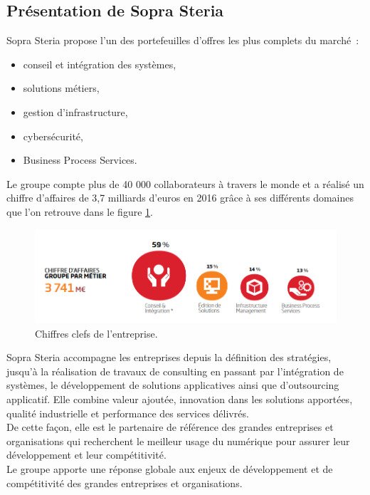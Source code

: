 \documentclass[12pt,a4paper]{article}
\begin{document}
\subsection{Présentation de Sopra Steria}
Sopra Steria propose l’un des portefeuilles d’offres les plus complets du marché~:
\begin{itemize}
\item conseil et intégration des systèmes,
\item solutions métiers,
\item gestion d'infrastructure,
\item cybersécurité,
\item Business Process Services.
\end{itemize}
Le groupe compte plus de 40 000 collaborateurs à travers le monde et a réalisé un chiffre d’affaires de 3,7 milliards d’euros en 2016 grâce à ses différents domaines que l'on retrouve dans le figure \ref{chiffresCles}.
\smallbreak
\begin{figure}[H]
	\begin{center}
		\includegraphics[width=\textwidth,height=\textheight,keepaspectratio]{chiffesClefs.png}
		\caption{Chiffres clefs de l'entreprise.}
		\label{chiffresCles}
	\end{center}
\end{figure}
\newpage
Sopra Steria accompagne les entreprises depuis la définition des stratégies, jusqu’à la réalisation de travaux de consulting en passant par l’intégration de systèmes, le développement de solutions applicatives ainsi que d’outsourcing applicatif. 
Elle combine valeur ajoutée, innovation dans les solutions apportées, qualité industrielle et performance des services délivrés.\\
De cette façon, elle est le partenaire de référence des grandes entreprises et organisations qui recherchent le meilleur usage du numérique pour assurer leur développement et leur compétitivité.\\
Le groupe apporte une réponse globale aux enjeux de développement et de compétitivité des grandes entreprises et organisations.
\smallbreak
\end{document}
